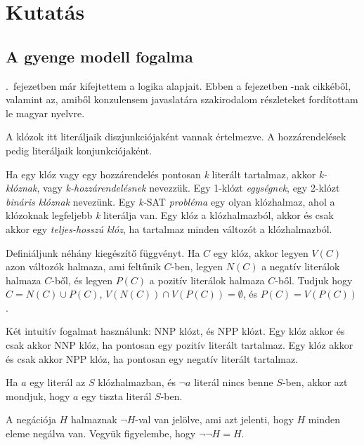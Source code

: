 \documentclass[
]{thesis-ekf}
\theoremstyle{definition}
\theoremstyle{remark}
\begin{document}
\chapter{Kutatás}
	\section{A gyenge modell fogalma}\label{sec-szakirodalom-forditas}
	
	\Az{\ref{sec-alap-fogalmak}}.~fejezetben már kifejtettem a logika alapjait. Ebben a fejezetben -nak cikkéből, valamint  az, amiből konzulensem javaslatára szakirodalom részleteket fordítottam le magyar nyelvre.
	
	\label{ssec-fogalmak}
	A klózok itt literáljaik diszjunkciójaként vannak értelmezve. A hozzárendelések pedig literáljaik konjunkciójaként.
	
	Ha egy klóz vagy egy hozzárendelés pontosan \emph{k} literált tartalmaz, akkor \emph{k-klóznak}, vagy \emph{k-hozzárendelésnek} nevezzük. Egy 1-klózt \emph{egységnek}, egy 2-klózt \emph{bináris klóznak} nevezünk. Egy \emph{k-}\textsc{SAT} \emph{probléma} egy olyan klózhalmaz, ahol a klózoknak legfeljebb \emph{k} literálja van. Egy klóz a klózhalmazból, akkor és csak akkor egy \emph{teljes-hosszú klóz}, ha tartalmaz minden változót a klózhalmazból.
	
	Definiáljunk néhány kiegészítő függvényt. Ha $ C $ egy klóz, akkor legyen $ V(C) $ azon változók halmaza, ami feltűnik $ C $-ben, legyen $ N(C) $ a negatív literálok halmaza $ C $-ből, és legyen $ P(C) $ a pozitív literálok halmaza $ C $-ből. Tudjuk hogy $ C=N(C)\cup P(C)$, $V(N(C))\cap V(P(C))=\emptyset $, és $ P(C)=V(P(C)) $.
	
	Két intuitív fogalmat használunk: \textsc{NNP} klózt, és \textsc{NPP} klózt. Egy klóz akkor és csak akkor \textsc{NNP} klóz, ha pontosan egy pozitív literált tartalmaz. Egy klóz akkor és csak akkor \textsc{NPP} klóz, ha pontosan egy negatív literált tartalmaz.
	
	Ha $ a $ egy literál az $ S $ klózhalmazban, és $ \neg a $ literál nincs benne $ S $-ben, akkor azt mondjuk, hogy $ a $ egy tiszta literál $ S $-ben.
	
	A negációja $ H $ halmaznak $ \neg H $-val van jelölve, ami azt jelenti, hogy $ H $ minden eleme negálva van. Vegyük figyelembe, hogy $ \neg\neg H=H $.
\end{document}
